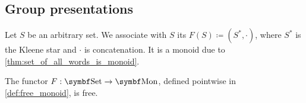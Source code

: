\subsection{Group presentations}\label{subsec:group_presentations}

\begin{definition}\label{def:free_monoid}\cite[306]{Knapp2016BAlg}
  Let \( S \) be an arbitrary set. We associate with \( S \) its  \( F(S) \coloneqq (S^{*}, \cdot) \), where \( S^{*} \) is the Kleene star and \( \cdot \) is concatenation. It is a monoid due to \cref{thm:set_of_all_words_is_monoid}.
\end{definition}

\begin{proposition}\label{thm:free_monoid_is_free_functor}
  The functor \( F: \Cat{Set} \to \Cat{Mon} \), defined pointwise in \cref{def:free_monoid}, is free.
\end{proposition}
